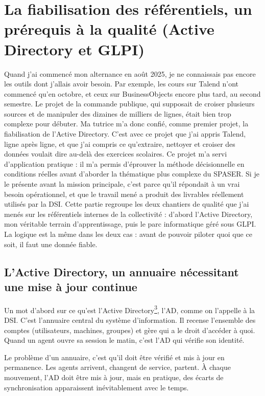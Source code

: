 \documentclass[11pt,a4paper]{article}
\newcommand{\lexref}[1]{\hyperlink{lex:#1}{\textsuperscript{#1}}}
\begin{document}
\section{La fiabilisation des référentiels, un prérequis à la qualité (Active Directory et GLPI)}
Quand j'ai commencé mon alternance en août 2025, je ne connaissais pas encore les outils dont j'allais avoir besoin. Par exemple, les cours sur Talend n'ont commencé qu'en octobre, et ceux sur BusinessObjects encore plus tard, au second semestre. Le projet de la commande publique, qui supposait de croiser plusieurs sources et de manipuler des dizaines de milliers de lignes, était bien trop complexe pour débuter. Ma tutrice m'a donc confié, comme premier projet, la fiabilisation de l'Active Directory. C'est avec ce projet que j'ai appris Talend, ligne après ligne, et que j'ai compris ce qu'extraire, nettoyer et croiser des données voulait dire au-delà des exercices scolaires. Ce projet m'a servi d'application pratique : il m'a permis d'éprouver la méthode décisionnelle en conditions réelles avant d'aborder la thématique plus complexe du SPASER. Si je le présente avant la mission principale, c'est parce qu'il répondait à un vrai besoin opérationnel, et que le travail mené a produit des livrables réellement utilisés par la DSI. Cette partie regroupe les deux chantiers de qualité que j'ai menés sur les référentiels internes de la collectivité : d'abord l'Active Directory, mon véritable terrain d'apprentissage, puis le parc informatique géré sous GLPI. La logique est la même dans les deux cas : avant de pouvoir piloter quoi que ce soit, il faut une donnée fiable.

\subsection{L'Active Directory, un annuaire nécessitant une mise à jour continue}
Un mot d'abord sur ce qu'est l'Active Directory\lexref{3}, l'AD, comme on l'appelle à la DSI. C'est l'annuaire central du système d'information. Il recense l'ensemble des comptes (utilisateurs, machines, groupes) et gère qui a le droit d'accéder à quoi. Quand un agent ouvre sa session le matin, c'est l'AD qui vérifie son identité.

Le problème d'un annuaire, c'est qu'il doit être vérifié et mis à jour en permanence. Les agents arrivent, changent de service, partent. À chaque mouvement, l'AD doit être mis à jour, mais en pratique, des écarts de synchronisation apparaissent inévitablement avec le temps.
\end{document}
